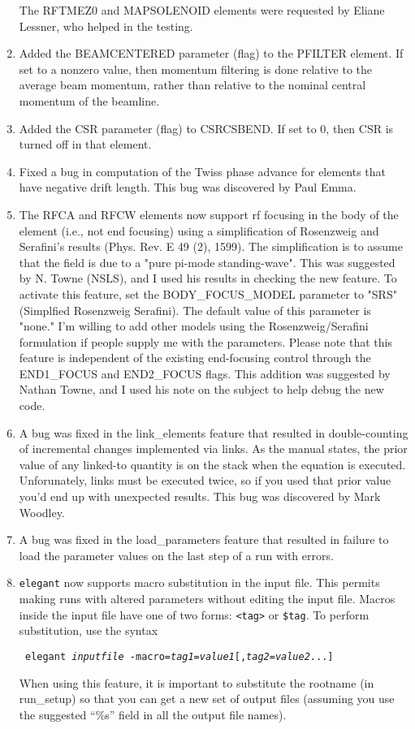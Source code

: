 \documentclass[11pt]{article}
\begin{document}
\begin{enumerate}
The RFTMEZ0 and MAPSOLENOID elements were requested by Eliane Lessner, who
helped in the testing.

\item  Added the BEAMCENTERED parameter (flag) to the PFILTER element. If set to
a nonzero value, then momentum filtering is done relative to the average beam
momentum, rather than relative to the nominal central momentum of the beamline.

\item Added the CSR parameter (flag) to CSRCSBEND.  If set to 0, then CSR is turned
off in that element.

\item Fixed a bug in computation of the Twiss phase advance for elements
that have negative drift length.  This bug was discovered by Paul Emma.

\item The RFCA and RFCW elements now support rf focusing in the body
of the element (i.e., not end focusing) using a simplification of
Rosenzweig and Serafini's results (Phys. Rev. E 49 (2), 1599).  The
simplification is to assume that the field is due to a "pure pi-mode
standing-wave".  This was suggested by N. Towne (NSLS), and I used his
results in checking the new feature.  To activate this feature, set
the BODY\_FOCUS\_MODEL parameter to "SRS" (Simplfied Rosenzweig
Serafini).  The default value of this parameter is "none."  I'm
willing to add other models using the Rosenzweig/Serafini formulation
if people supply me with the parameters.  Please note that this
feature is independent of the existing end-focusing control through
the END1\_FOCUS and END2\_FOCUS flags.  This addition was suggested by
Nathan Towne, and I used his note on the subject to help debug the new
code.

\item A bug was fixed in the link\_elements feature that resulted in
double-counting of incremental changes implemented via links.  As the
manual states, the prior value of any linked-to quantity is on the
stack when the equation is executed.  Unforunately, links must be
executed twice, so if you used that prior value you'd end up with
unexpected results.  This bug was discovered by Mark Woodley.

\item A bug was fixed in the load\_parameters feature that resulted in
failure to load the parameter values on the last step of a run with
errors.

\item {\tt elegant} now supports macro substitution in the input file.
This permits making runs with altered parameters without editing the input
file.  Macros inside the input file have one of two forms: \verb|<tag>|
or \verb|$tag|.  To perform substitution, use the syntax
\begin{flushleft}{\tt
elegant {\em inputfile} -macro={\em tag1}={\em value1}[,{\em tag2}={\em value2}...]
}\end{flushleft}
When using this feature, it is important to substitute the rootname
(in run\_setup) so that you can get a new set of output files (assuming
you use the suggested ``\%s'' field in all the output file names).


\end{enumerate}
\end{document}
